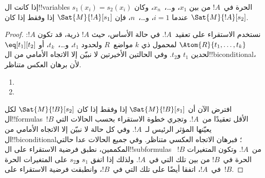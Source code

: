 \documentclass[../../../include/open-logic-section]{subfiles}
\begin{document}
\begin{prop}
إذا كانت ال!!{variable}s الحرة في~$!A$ من بين $x_1$، و\dots،~$x_n$،
وكان $s_1(x_i) = s_2(x_i)$ عندما $i = 1$، و\dots،~$n$، فإن
$\Sat{M}{!A}[s_1]$ إذا وفقط إذا كان $\Sat{M}{!A}[s_2]$.
\end{prop}

\begin{proof}
نستخدم الاستقراء على تعقيد~$!A$. في حالة الأساس، حيث $!A$ ذرية، قد
تكون $!A$:
$\Atom{R}{t_1, \dots, t_k}$ لمحمول ذي $k$ مواضع~$R$
ولحدود $t_1$، و\dots،~$t_k$، أو $\eq[t_1][t_2]$ لحدين $t_1$
و$t_2$. وفي الحالتين الأخيرتين لا نبيّن إلا الاتجاه الأمامي من
ال!!{biconditional}، لأن برهان العكس متناظر.

\begin{enumerate}


\item
\item
\end{enumerate}

افترض الآن أن $\Sat{M}{!B}[s_1]$ إذا وفقط إذا كان
$\Sat{M}{!B}[s_2]$ لكل ال!!{formula}s~$!B$ الأقل تعقيدًا من~$!A$.
وتجري خطوة الاستقراء بحسب الحالات التي يعيّنها المؤثر الرئيس
لـ~$!A$. وفي كل حالة لا نبيّن إلا الاتجاه الأمامي من
ال!!{biconditional}؛ فبرهان الاتجاه العكسي متناظر. وفي جميع الحالات
عدا حالتي المكممين، نطبق فرضية الاستقراء على ال!!{subformula}s
~$!B$ من~$!A$. وتكون المتغيرات الحرة في~$!B$ من بين تلك التي
في~$!A$. ولذلك إذا اتفق $s_1$ و$s_2$ على المتغيرات الحرة في~$!A$،
اتفقا أيضًا على تلك التي في~$!B$، وانطبقت فرضية الاستقراء على~$!B$.


\end{proof}
\end{document}
